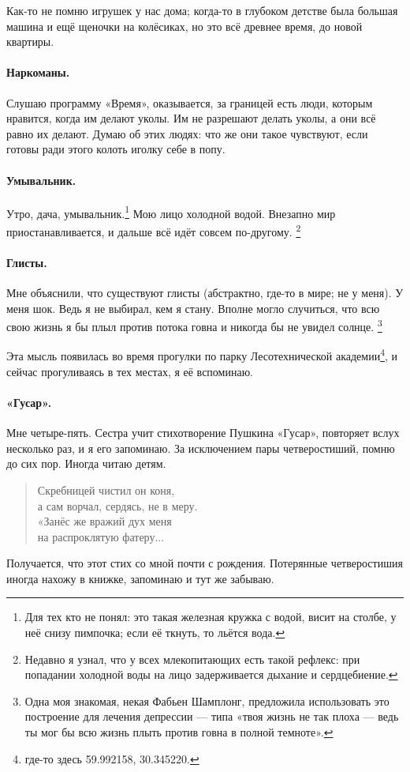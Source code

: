 \documentclass{book}
\begin{document}
Как-то не помню игрушек у нас дома; когда-то в глубоком детстве была большая машина и ещё щеночки на колёсиках, но это всё древнее время, до новой квартиры.


\paragraph{Наркоманы.}
Слушаю программу «Время», оказывается, за границей есть люди, которым нравится, когда им делают уколы.
Им не разрешают делать уколы, а они всё равно их делают.
Думаю об этих людях: что же они такое чувствуют, если готовы ради этого колоть иголку себе в попу.


\paragraph{Умывальник.}
Утро, дача, умывальник.\footnote{Для тех кто не понял: это такая железная кружка с водой, висит на столбе, у неё снизу пимпочка; если её ткнуть, то льётся вода.}
Мою лицо холодной водой.
Внезапно мир приостанавливается, и дальше всё идёт совсем по-другому.%
\footnote{
Недавно я узнал, что у всех млекопитающих есть такой рефлекс:
при попадании холодной воды на лицо задерживается дыхание и сердцебиение.}

\paragraph{Глисты.} Мне объяснили, что существуют глисты (абстрактно, где-то в мире; не у меня).
У меня шок. 
Ведь я не выбирал, кем я стану.
Вполне могло случиться, что всю свою жизнь я бы плыл против потока говна и никогда бы не увидел солнце.%
\footnote{Одна моя знакомая, некая Фабьен Шамплонг, предложила использовать это построение для лечения депрессии --- типа «твоя жизнь не так плоха --- ведь ты мог бы всю жизнь плыть против говна в полной темноте».}

Эта мысль появилась во время прогулки по парку Лесотехнической академии\footnote{где-то здесь 59.992158, 30.345220.},
и сейчас прогуливаясь в тех местах, я её вспоминаю.

\paragraph{«Гусар».}
Мне четыре-пять.
Сестра учит стихотворение Пушкина «Гусар», повторяет вслух несколько раз, и я его запоминаю.
За исключением пары четверостиший, помню до сих пор. 
Иногда читаю детям.
\begin{verse}
Скребницей чистил он коня,\\
а сам ворчал, сердясь, не в меру.\\
«Занёс же вражий дух меня\\
на распроклятую фатеру...
\end{verse}
Получается, что этот стих со мной почти с рождения.
Потерянные четверостишия иногда нахожу в книжке, запоминаю и тут же забываю.
\end{document}
